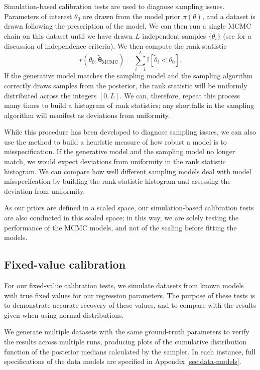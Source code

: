\documentclass[fleqn,usenatbib]{mnras}
\begin{document}
Simulation-based calibration tests \citep{Cook:2006, Talts:2018} are used to
diagnose sampling issues. Parameters of interest $\theta_0$ are drawn from the
model prior $\pi(\theta)$, and a dataset is drawn following the prescription of
the model. We can then run a single MCMC chain on this dataset until we have
drawn $L$ independent samples $\{\tilde{\theta}_{i}\}$ (see \citet{Talts:2018}
for a discussion of independence criteria). We then compute the rank statistic
\begin{equation}
    r(\theta_0, \tilde{\boldsymbol{\theta}}_{\text{MCMC}})
        = \sum_{i = 1}^{L} \mathbb I [\tilde{\theta}_i < \theta_0].
\end{equation}
If the generative model matches the sampling model and the sampling algorithm
correctly draws samples from the posterior, the rank statistic will be uniformly
distributed across the integers $[0, L]$. We can, therefore, repeat this process
many times to build a histogram of rank statistics; any shortfalls in the
sampling algorithm will manifest as deviations from uniformity.

While this procedure has been developed to diagnose sampling issues, we can also
use the method to build a heuristic measure of how robust a model is to
misspecification. If the generative model and the sampling model no longer
match, we would expect deviations from uniformity in the rank statistic
histogram. We can compare how well different sampling models deal with model
misspecifcation by building the rank statistic histogram and assessing the
deviation from uniformity.

As our priors are defined in a scaled space, our simulation-based calibration
tests are also conducted in this scaled space; in this way, we are solely
testing the performance of the MCMC models, and not of the scaling before
fitting the models.

\subsection{Fixed-value calibration}
\label{sec:methods.fixed}

For our fixed-value calibration tests, we simulate datasets from known models
with true fixed values for our regression parameters. The purpose of these tests
is to demonstrate accurate recovery of these values, and to compare with the
results given when using normal distributions.

We generate multiple datasets with the same ground-truth parameters to verify
the results across multiple runs, producing plots of the cumulative distribution
function of the posterior medians calculated by the sampler. In each instance,
full specifications of the data models are specified in Appendix
\ref{sec:data-models}.
\end{document}
